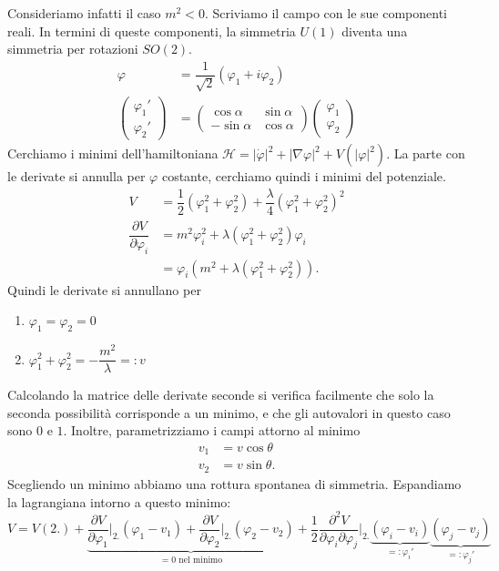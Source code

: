 \documentclass[italian,a4paper]{article}
\theoremstyle{definition}
\begin{document}
Consideriamo infatti il caso $m^2 < 0$.
Scriviamo il campo con le sue componenti reali. In termini di queste
componenti, la simmetria $U(1)$ diventa una simmetria per rotazioni $SO(2)$.
\begin{align*}
    \varphi &= \dfrac{1}{\sqrt{2}}(\varphi_1 + i \varphi_2)\\
    \begin{pmatrix}
        \varphi_1'\\
        \varphi_2'
    \end{pmatrix} &= 
    \begin{pmatrix}
        \cos \alpha & \sin \alpha \\
        -\sin \alpha & \cos \alpha
    \end{pmatrix}
    \begin{pmatrix}
        \varphi_1\\
        \varphi_2
    \end{pmatrix}
\end{align*}
Cerchiamo i minimi dell'hamiltoniana $\mathscr H = |\dot\varphi|^2 + |\nabla
\varphi|^2 + V(|\varphi|^2)$. La parte con le derivate si annulla per
$\varphi$ costante, cerchiamo quindi i minimi del potenziale.
\begin{align*}
    V &=\dfrac{1}{2}(\varphi_1^2 + \varphi_2^2) +
    \dfrac{\lambda}{4}(\varphi_1^2 + \varphi_2^2)^2\\
    \dfrac{\partial V}{\partial \varphi_i} &= m^2 \varphi_i ^ 2 +
    \lambda(\varphi_1^2 + \varphi_2^2)\varphi_i\\
    &= \varphi_i (m^2 + \lambda(\varphi_1^2 + \varphi_2^2)).
\end{align*}
Quindi le derivate si annullano per 
\begin{enumerate}
    \item $\varphi_1 = \varphi_2 = 0$
    \item $\varphi_1^2 + \varphi_2^2 = - \dfrac{m^2}{\lambda} = \mathop: v$
\end{enumerate}
Calcolando la matrice delle derivate
seconde si verifica facilmente che solo la seconda possibilit\`a corrisponde
a un minimo, e che gli autovalori in questo caso sono $0$ e $1$. Inoltre,
parametrizziamo i campi attorno al minimo
\begin{align*}
    v_1 &=v \cos \theta\\
    v_2 &=v \sin \theta.
\end{align*}
Scegliendo un minimo abbiamo una rottura spontanea di simmetria. Espandiamo
la lagrangiana intorno a questo minimo:
\begin{equation*}
    V = V(2.)
    + \underbrace{\dfrac{\partial V}{\partial \varphi_1}\rvert_{2.}(\varphi_1 - v_1)
    + \dfrac{\partial V}{\partial \varphi_2}\rvert_{2.}(\varphi_2 -
    v_2)}_{= 0\text{ nel minimo}}
    + \dfrac{1}{2}\dfrac{\partial^2 V}{\partial \varphi_i\partial \varphi_j}|_{2.}
    \underbrace{(\varphi_i - v_i)}_{=\mathop:\varphi_i'}\underbrace{(\varphi_j -
    v_j)}_{=\mathop:\varphi_j'}
\end{equation*}
\end{document}
